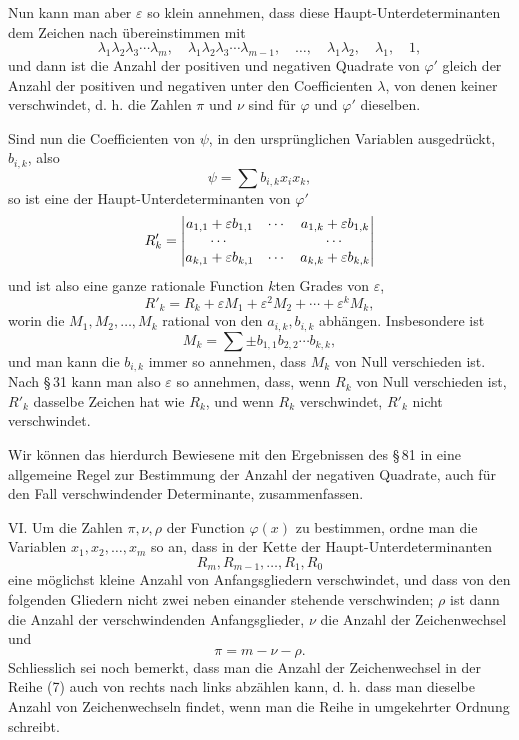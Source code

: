 \documentclass[11pt]{article}
\begin{document}
Nun kann man aber $\varepsilon$ so klein annehmen, dass diese Haupt-Unterdeterminanten dem Zeichen nach \"ubereinstimmen mit
\[
\lambda_1\lambda_2\lambda_3\cdots\lambda_m,
\quad
\lambda_1\lambda_2\lambda_3\cdots\lambda_{m-1},
\quad\ldots,
\quad
\lambda_1\lambda_2,
\quad \lambda_1,
\quad 1,
\]
und dann ist die Anzahl der positiven und negativen Quadrate von $\varphi'$ gleich der Anzahl der positiven und negativen unter den Coefficienten $\lambda$, von denen keiner verschwindet, d. h. die Zahlen $\pi$ und $\nu$ sind f\"ur $\varphi$ und $\varphi'$ dieselben.

Sind nun die Coefficienten von $\psi$, in den urspr\"unglichen Variablen ausgedr\"uckt, $b_{i,k}$, also
\[
        \psi=\sum b_{i,k}x_i x_k,
\]
so ist eine der Haupt-Unterdeterminanten von $\varphi'$
\[
        R'_k=\begin{vmatrix}
        a_{1,1}+\varepsilon b_{1,1}&\cdots&a_{1,k}+\varepsilon b_{1,k}\cr
        \cdots&&\cdots\cr
        a_{k,1}+\varepsilon b_{k,1}&\cdots&a_{k,k}+\varepsilon b_{k,k}
        \end{vmatrix}
\]
und ist also eine ganze rationale Function $k$ten Grades von $\varepsilon$,
\[
        R'_k=R_k+\varepsilon M_1+\varepsilon^2M_2+
\cdots+\varepsilon^kM_k,
\]
worin die $M_1,M_2,
\ldots,M_k$ rational von den $a_{i,k},b_{i,k}$ abh\"angen. Insbesondere ist
\[
        M_k=\sum \pm b_{1,1}b_{2,2}\cdots b_{k,k},
\]
und man kann die $b_{i,k}$ immer so annehmen, dass $M_k$ von Null verschieden ist. Nach \S\,31 kann man also $\varepsilon$ so annehmen, dass, wenn $R_k$ von Null verschieden ist, $R'_k$ dasselbe Zeichen hat wie $R_k$, und wenn $R_k$ verschwindet, $R'_k$ nicht verschwindet.

Wir k\"onnen das hierdurch Bewiesene mit den Ergebnissen des \S\,81 in eine allgemeine Regel zur Bestimmung der Anzahl der negativen Quadrate, auch f\"ur den Fall verschwindender Determinante, zusammenfassen.

VI. Um die Zahlen $\pi,\nu,\rho$ der Function $\varphi(x)$ zu bestimmen, ordne man die Variablen $x_1,x_2,
\ldots,x_m$ so an, dass in der Kette der Haupt-Unterdeterminanten
\begin{equation}
        R_m,
        R_{m-1},
        \ldots,R_1,R_0
\tag{7}
\end{equation}
eine m\"oglichst kleine Anzahl von Anfangsgliedern verschwindet, und dass von den folgenden Gliedern nicht zwei neben einander stehende verschwinden; $\rho$ ist dann die Anzahl der verschwindenden Anfangsglieder, $\nu$ die Anzahl der Zeichenwechsel und
\[
        \pi=m-\nu-\rho.
\]
Schliesslich sei noch bemerkt, dass man die Anzahl der Zeichenwechsel in der Reihe (7) auch von rechts nach links abz\"ahlen kann, d. h. dass man dieselbe Anzahl von Zeichenwechseln findet, wenn man die Reihe in umgekehrter Ordnung schreibt.
\end{document}
